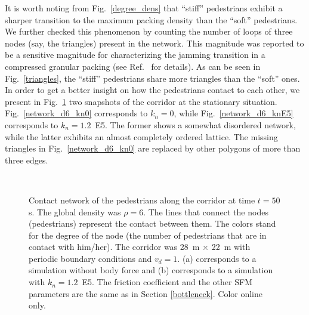 \documentclass[preprint,12pt]{elsarticle}
\begin{document}
It is worth noting from Fig.~\ref{degree_dens} that ``stiff'' pedestrians
exhibit a sharper transition to the maximum packing density than  the ``soft''
pedestrians. We further checked this phenomenon by counting the  number of loops
of three nodes (say, the triangles) present in the network.  This magnitude was
reported to be a sensitive magnitude for characterizing the  jamming transition
in a compressed granular packing (see  Ref.~\cite{pugnaloni_2013} for details).
As can be seen in  Fig.~\ref{triangles}, the ``stiff'' pedestrians share more
triangles  than the ``soft'' ones.\\

In order to get a better insight on how the pedestrians contact to each other,
we present in Fig.~\ref{network_corridor} two snapshots of the corridor at the
stationary situation. Fig.~\ref{network_d6_kn0} corresponds to  $k_n=0$, while
Fig.~\ref{network_d6_knE5} corresponds to $k_n=1.2$~E5. The  former shows a
somewhat disordered network, while the latter exhibits an almost  completely
ordered lattice. The missing triangles in Fig.~\ref{network_d6_kn0}  are
replaced by other polygons of more than three edges. \\


\begin{figure}[!htbp]
\centering
{}\ 
\\
\caption[width=0.47\columnwidth]{Contact network of the pedestrians along the 
corridor at time $t=50\,$s. The global density was $\rho=6$.  The lines that 
connect the nodes (pedestrians) represent the contact between them. The colors 
stand for the degree of the node (the number of pedestrians that are in contact 
with him/her). The corridor was 28~m $\times$ 22~m with periodic boundary 
conditions and $v_d=1$. (a) corresponds to a simulation without body force and 
(b) corresponds to a simulation with $k_n=1.2$~E5. The friction coefficient and 
the other SFM parameters are the same as in Section \ref{bottleneck}. Color 
online only.}
\label{network_corridor}
\end{figure}
\end{document}
